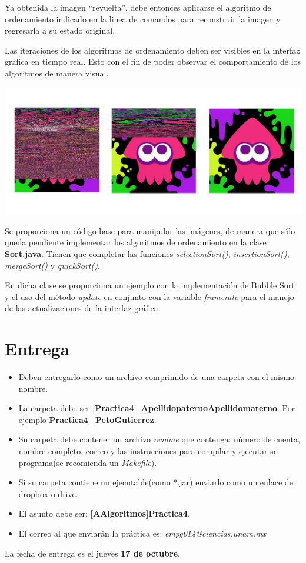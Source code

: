 \documentclass{article}
\begin{document}
Ya obtenida la imagen ``revuelta'', debe entonces aplicarse el algoritmo de ordenamiento indicado en la linea de comandos para reconstruir la imagen y regresarla a su estado original.

Las iteraciones de los algoritmos de ordenamiento deben ser visibles en la interfaz grafica en tiempo real. Esto con el fin de poder observar el comportamiento de los algoritmos de manera visual.

\begin{center}
\includegraphics[scale=0.25]{ink3}
\end{center}

Se proporciona un código base para manipular las imágenes, de manera que sólo queda pendiente implementar los algoritmos de ordenamiento en la clase \textbf{Sort.java}. Tienen que completar las funciones \emph{selectionSort()}, \emph{insertionSort()}, \emph{mergeSort()} y \emph{quickSort()}.

En dicha clase se proporciona un ejemplo con la implementación de Bubble Sort y el uso del método \emph{update} en conjunto con la variable \emph{framerate} para el manejo de las actualizaciones de la interfaz gráfica.

\section{Entrega}

\begin{itemize}
\item Deben entregarlo como un archivo comprimido de una carpeta con el mismo nombre.
\item La carpeta debe ser: \textbf{Practica4\_ApellidopaternoApellidomaterno}. Por ejemplo \textbf{Practica4\_PetoGutierrez}.
\item Su carpeta debe contener un archivo \emph{readme} que contenga: número de cuenta, nombre completo, 
correo y las instrucciones para compilar y ejecutar su programa(se recomienda un \emph{Makefile}).
\item Si su carpeta contiene un ejecutable(como *.jar) enviarlo como un enlace de dropbox o drive.
\item El asunto debe ser: \textbf{[AAlgoritmos]Practica4}.
\item El correo al que enviarán la práctica es: \emph{empg014@ciencias.unam.mx}
\end{itemize}

La fecha de entrega es el jueves \textbf{17 de octubre}.
\end{document}
